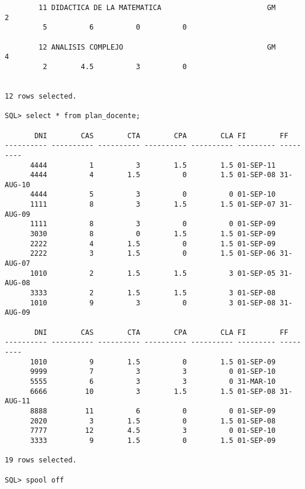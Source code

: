 \documentclass[11pt]{report}
\begin{document}
\begin{verbatim}
        11 DIDACTICA DE LA MATEMATICA                         GM            2
         5          6          0          0 

        12 ANALISIS COMPLEJO                                  GM            4
         2        4.5          3          0 


12 rows selected.

SQL> select * from plan_docente;

       DNI        CAS        CTA        CPA        CLA FI        FF
---------- ---------- ---------- ---------- ---------- --------- ---------
      4444          1          3        1.5        1.5 01-SEP-11
      4444          4        1.5          0        1.5 01-SEP-08 31-AUG-10
      4444          5          3          0          0 01-SEP-10
      1111          8          3        1.5        1.5 01-SEP-07 31-AUG-09
      1111          8          3          0          0 01-SEP-09
      3030          8          0        1.5        1.5 01-SEP-09
      2222          4        1.5          0        1.5 01-SEP-09
      2222          3        1.5          0        1.5 01-SEP-06 31-AUG-07 
      1010          2        1.5        1.5          3 01-SEP-05 31-AUG-08
      3333          2        1.5        1.5          3 01-SEP-08
      1010          9          3          0          3 01-SEP-08 31-AUG-09

       DNI        CAS        CTA        CPA        CLA FI        FF
---------- ---------- ---------- ---------- ---------- --------- ---------
      1010          9        1.5          0        1.5 01-SEP-09
      9999          7          3          3          0 01-SEP-10
      5555          6          3          3          0 31-MAR-10
      6666         10          3        1.5        1.5 01-SEP-08 31-AUG-11
      8888         11          6          0          0 01-SEP-09
      2020          3        1.5          0        1.5 01-SEP-08
      7777         12        4.5          3          0 01-SEP-10
      3333          9        1.5          0        1.5 01-SEP-09

19 rows selected.

SQL> spool off
\end{verbatim}
\end{document}
